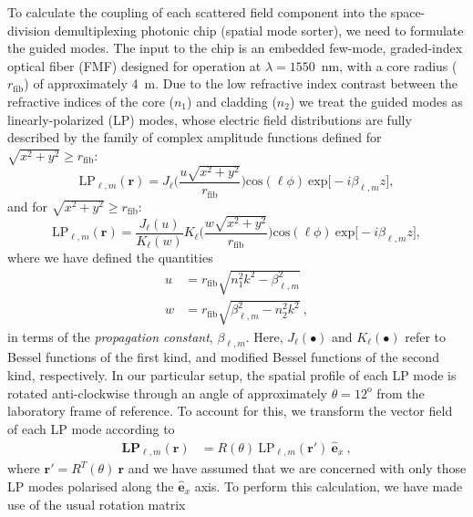\documentclass[%
 reprint,
 amsmath,amssymb,
 aps,
pra,
]{revtex4-2}
\begin{document}
\noindent To calculate the coupling of each scattered field component into the space-division demultiplexing photonic chip (spatial mode sorter), we need to formulate the guided modes. The input to the chip is an embedded few-mode, graded-index optical fiber (FMF) designed for operation at $\lambda = 1550$~nm, with a core radius ($r_{\mathrm{fib}}$) of approximately 4~\textmu m. Due to the low refractive index contrast between the refractive indices of the core ($n_{1}$) and cladding ($n_{2}$) we treat the guided modes as linearly-polarized (LP) modes, whose electric field distributions are fully described by the family of complex amplitude functions defined for $\sqrt{x^{2}+y^{2}} \geq r_{\mathrm{fib}}$:
\begin{equation}
    \mathrm{LP}_{\ell, m}(\boldsymbol{r}) =
    J_{\ell}\Big(\frac{u\sqrt{x^{2}+y^{2}}}{r_{\mathrm{fib}}}\Big)\mathrm{cos}\left(\ell\phi\right)~\mathrm{exp}\big[-i\beta_{\ell, m}z\big],
\end{equation}
and for $\sqrt{x^{2}+y^{2}} \geq r_{\mathrm{fib}}$:
\begin{equation}
    \mathrm{LP}_{\ell, m}(\boldsymbol{r}) =\frac{J_{\ell}(u)}{K_{\ell}(w)}K_{\ell}\Big(\frac{w\sqrt{x^{2}+y^{2}}}{r_{\mathrm{fib}}}\Big)\mathrm{cos}\left(\ell\phi\right)~\mathrm{exp}\big[-i\beta_{\ell,m}z\big],
\end{equation}
where we have defined the quantities 
\begin{align}
    u &= r_{\mathrm{fib}}\sqrt{n_{1}^{2}k^{2} - \beta_{\ell, m}^{2}} \\
    w &= r_{\mathrm{fib}}\sqrt{\beta_{\ell, m}^{2} - n_{2}^{2}k^{2}} ~ ,
\end{align}
in terms of the \textsl{propagation constant}, $\beta_{\ell, m}$. Here, $J_{\ell}(\bullet)$ and $K_{\ell}(\bullet)$ refer to Bessel functions of the first kind, and modified Bessel functions of the second kind, respectively. In our particular setup, the spatial profile of each LP mode is rotated anti-clockwise through an angle of approximately $\theta = 12^{\mathrm{o}}$ from the laboratory frame of reference. To account for this, we transform the vector field of each LP mode according to
\begin{align}
    \textbf{LP}_{\ell,m}(\boldsymbol{r}) &= R(\theta)~ \mathrm{LP}_{\ell,m}(\boldsymbol{r}') ~\hat{\boldsymbol{e}}_{x} ~ ,
\end{align}
where $\boldsymbol{r}'=R^{T}(\theta)~\boldsymbol{r}$ and we have assumed that we are concerned with only those LP modes polarised along the $\hat{\boldsymbol{e}}_{x}$ axis. To perform this calculation, we have made use of the usual rotation matrix
\end{document}
